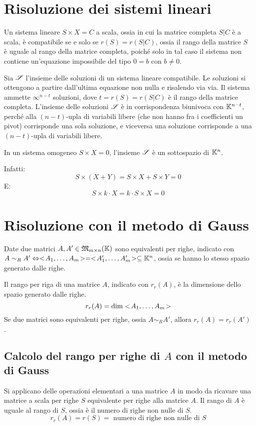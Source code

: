 \section{Risoluzione dei sistemi lineari}

Un sistema lineare $S \times X = C$ a scala, ossia in cui la matrice completa $S | C$ \`e a scala, \`e compatibile se e solo se $r(S) = r(S|C)$, ossia il rango della matrice $S$ \`e uguale al rango della matrice completa, poich\'e solo in tal caso il sistema non contiene un'equazione impossibile del tipo $0 = b$ con $b \neq 0$.

Sia $\mathscr{S}$ l'insieme delle soluzioni di un sistema lineare compatibile. Le soluzioni si ottengono a partire dall'ultima equazione non nulla e risalendo via via. Il sistema ammette $\infty^{n - t}$ soluzioni, dove $t = r(S) = r(S | C)$ \`e il rango della matrice completa. L'insieme delle soluzioni $\mathscr{S}$ \`e in corrispondenza biunivoca con $\mathbb{K}^{n - t}$, perch\'e alla $(n-t)$-upla di variabili libere (che non hanno fra i coefficienti un pivot) corrisponde una sola soluzione, e viceversa una soluzione corrisponde a una $(n-t)$-upla di variabili libere.

\begin{prop}
In un sistema omogeneo $S \times X = 0$, l'insieme $\mathscr{S}$ \`e un sottospazio di $\mathbb{K}^n$.
\end{prop}
Infatti:
\[
S \times (X + Y) = S \times X + S \times Y = 0
\]
E:
\[
S \times k \cdot X = k \cdot S \times X = 0
\]

\section{Risoluzione con il metodo di Gauss}

\begin{defn}
Date due matrici $A, A' \in \mathfrak{M}_{m \times n} (\mathbb{K})$ sono equivalenti per righe, indicato con $A \sim_{R} A' \Leftrightarrow <\!{A_1, \ldots, A_m}\!> = <\!{A_1', \ldots, A_m'}\!> \subseteq \mathbb{K}^n$, ossia se hanno lo stesso spazio generato dalle righe.
\end{defn}

Il rango per riga di una matrice $A$, indicato con $r_r(A)$, \`e la dimensione dello spazio generato dalle righe.
\[
r_r(A) = \dim <\!{A_1, \ldots, A_m}\!>
\]
Se due matrici sono equivalenti per righe, ossia $A \sim_{R} A'$, allora $r_r(A) = r_r(A')$.

\subsection{Calcolo del rango per righe di $A$ con il metodo di Gauss}
Si applicano delle operazioni elementari a una matrice $A$ in modo da ricavare una matrice a scala per righe $S$ equivalente per righe alla matrice $A$. Il rango di $A$ \`e uguale al rango di $S$, ossia \`e il numero di righe non nulle di $S$.
\[
r_r(A) = r(S) = \text{ numero di righe non nulle di } S
\]
